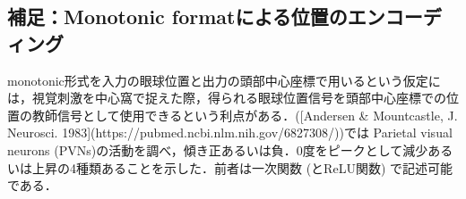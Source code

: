 \subsection{補足：Monotonic formatによる位置のエンコーディング}
monotonic形式を入力の眼球位置と出力の頭部中心座標で用いるという仮定には，視覚刺激を中心窩で捉えた際，得られる眼球位置信号を頭部中心座標での位置の教師信号として使用できるという利点がある．([Andersen & Mountcastle, J. Neurosci. 1983](https://pubmed.ncbi.nlm.nih.gov/6827308/))では Parietal visual neurons (PVNs)の活動を調べ，傾き正あるいは負．0度をピークとして減少あるいは上昇の4種類あることを示した．前者は一次関数 (とReLU関数) で記述可能である．
